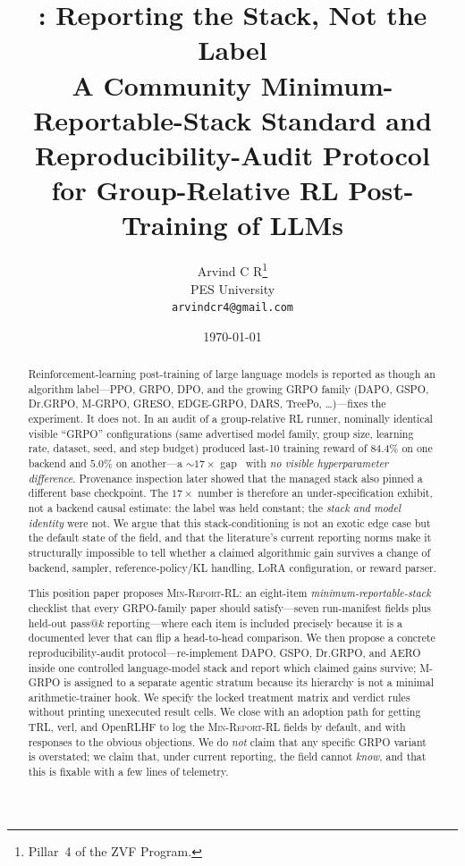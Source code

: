 \documentclass[11pt]{article}
\title{\minreport{}: Reporting the Stack, Not the Label\\
\large A Community Minimum-Reportable-Stack Standard and
Reproducibility-Audit Protocol\\for Group-Relative RL Post-Training of LLMs}
\author{Arvind C R\thanks{Pillar~4 of the ZVF Program.}\\
PES University\\\texttt{arvindcr4@gmail.com}}
\date{\today}
\newcommand{\minreport}{\textsc{Min-Report-RL}}
\begin{document}
\maketitle

\begin{abstract}
Reinforcement-learning post-training of large language models is reported as
though an algorithm label---PPO, GRPO, DPO, and the growing GRPO family
(DAPO, GSPO, Dr.GRPO, M-GRPO, GRESO, EDGE-GRPO, DARS, TreePo,
\ldots)---fixes the experiment. It does not.
In an audit of a group-relative RL runner, nominally identical visible
``GRPO'' configurations (same advertised model family, group size, learning rate, dataset,
seed, and step budget) produced last-10 training reward of $84.4\%$ on one
backend and $5.0\%$ on another---a $\sim 17\times$ gap~\citep{zvfaudit2026} with \emph{no visible
hyperparameter difference}. Provenance inspection later showed that the managed
stack also pinned a different base checkpoint. The $17\times$ number is therefore
an under-specification exhibit, not a backend causal estimate: the label was held
constant; the \emph{stack and model identity} were not. We argue that this
stack-conditioning is not an exotic edge case but the
default state of the field, and that the literature's current reporting norms
make it structurally impossible to tell whether a claimed algorithmic gain
survives a change of backend, sampler, reference-policy/KL handling, LoRA
configuration, or reward parser.

This position paper proposes \minreport{}: an eight-item
\emph{minimum-reportable-stack} checklist that every GRPO-family paper should
satisfy---seven run-manifest fields plus held-out pass@$k$ reporting---where
each item is included precisely because it is a documented
lever that can flip a head-to-head comparison. We then propose a concrete
reproducibility-audit protocol---re-implement DAPO, GSPO, Dr.GRPO, and AERO
inside one controlled language-model stack and report which claimed gains survive;
M-GRPO is assigned to a separate agentic stratum because its hierarchy is not a
minimal arithmetic-trainer hook. We specify the locked treatment matrix and
verdict rules without printing unexecuted result cells. We
close with an adoption path for getting TRL, verl, and OpenRLHF to log the
\minreport{} fields by default, and with responses to the obvious objections.
We do \emph{not} claim that any specific GRPO variant is overstated; we claim
that, under current reporting, the field cannot \emph{know}, and that this is
fixable with a few lines of telemetry.
\end{abstract}
\end{document}
